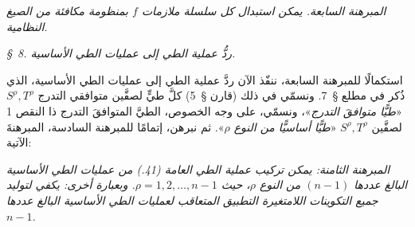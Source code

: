 \documentclass[11pt]{article}
\begin{document}
\emph{المبرهنة السابعة. يمكن استبدال كل سلسلة ملازمات $f$ بمنظومة مكافئة من الصيغ النظامية.}

\begin{center}
\emph{\S\ 8. ردُّ عملية الطي إلى عمليات الطي الأساسية.}
\end{center}
استكمالًا للمبرهنة السابعة، ننفّذ الآن ردَّ عملية الطي إلى عمليات الطي الأساسية، الذي ذُكر في مطلع \S\ 7. ونسمّي في ذلك (قارن \S\ 5) كلَّ طيٍّ لصفَّين متوافقي التدرج $S^\rho,T^\rho$ «\emph{طيًّا متوافقَ التدرج}»، ونسمّي، على وجه الخصوص، الطيَّ المتوافقَ التدرج ذا النقص 1 لصفَّين $S^\rho,T^\rho$ «\emph{طيًّا أساسيًّا من النوع $\rho$}». ثم نبرهن، إتمامًا للمبرهنة السادسة، المبرهنةَ الآتية:

\emph{المبرهنة الثامنة: يمكن تركيب عملية الطي العامة (41.) من عمليات الطي الأساسية البالغ عددها $(n-1)$ من النوع $\rho$، حيث $\rho=1,2,\ldots,n-1$. وبعبارة أخرى: يكفي لتوليد جميع التكوينات اللامتغيرة التطبيق المتعاقب لعمليات الطي الأساسية البالغ عددها $n-1$.}
\end{document}
